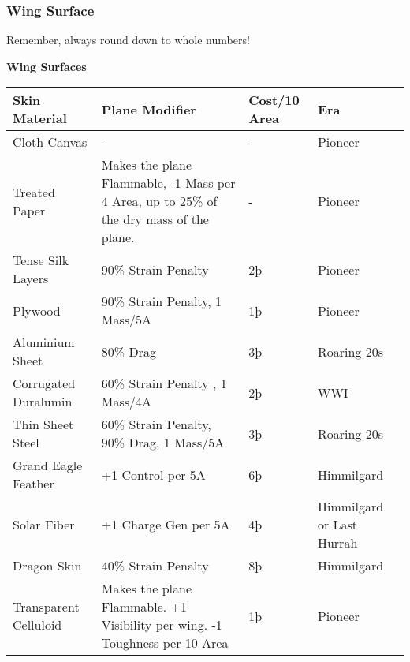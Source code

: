 \documentclass{article}
\begin{document}
\subsubsection{Wing Surface}
\label{_Wing Surface}

Remember, always round down to whole numbers!

\textbf{Wing Surfaces}

\begin{tabular}{|l|l|l|l|}
  \hline
  Skin Material                      & Plane Modifier                                       & Cost/10 Area & Era                       \\\hline
  Cloth Canvas                       & -                                                    & -            & Pioneer                   \\\hline
  Treated Paper                      & Makes the plane Flammable, -1 Mass per 4 Area, up to
  25\% of the dry mass of the plane. & -                                                    & Pioneer                                  \\\hline
  Tense Silk Layers                  & 90\% Strain Penalty                                  & 2þ           & Pioneer                   \\\hline
  Plywood                            & 90\% Strain Penalty, 1 Mass/5A                       & 1þ           & Pioneer                   \\\hline
  Aluminium Sheet                    & 80\% Drag                                            & 3þ           & Roaring 20s               \\\hline
  Corrugated Duralumin               & 60\% Strain Penalty , 1 Mass/4A                      & 2þ           & WWI                       \\\hline
  Thin Sheet Steel                   & 60\% Strain Penalty, 90\% Drag, 1 Mass/5A            & 3þ           &
  Roaring 20s                                                                                                                          \\\hline
  Grand Eagle Feather                & +1 Control per 5A                                    & 6þ           & Himmilgard                \\\hline
  Solar Fiber                        & +1 Charge Gen per 5A                                 & 4þ           & Himmilgard or Last Hurrah \\\hline
  Dragon Skin                        & 40\% Strain Penalty                                  & 8þ           & Himmilgard                \\\hline
  Transparent Celluloid              & Makes the plane Flammable. +1 Visibility per
  wing. -1 Toughness per 10 Area     & 1þ                                                   & Pioneer                                  \\\hline
\end{tabular}
\end{document}
